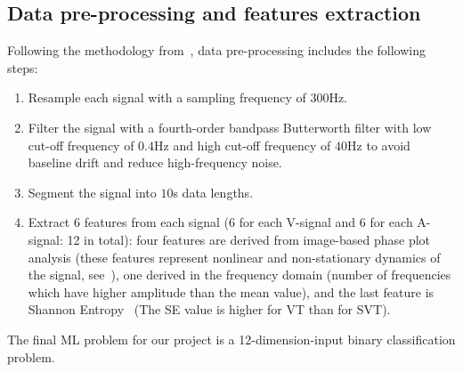 \subsection{Data pre-processing and features extraction}
Following the methodology 
from~\cite{hajeb2018automated}, data pre-processing includes the 
following steps:
\begin{enumerate}
	\item Resample each signal with a sampling frequency of $300$Hz.
	\item Filter the signal with a fourth-order bandpass Butterworth 
	filter with low cut-off frequency of $0.4$Hz and high cut-off 
	frequency of $40$Hz to avoid baseline drift and reduce 
	high-frequency noise. 
	\item Segment the signal into $10$s data lengths.
	\item Extract 6 features from each signal (6 for each V-signal 
	and 6 for each A-signal: 12 in total): 
	four features are derived 
	from image-based phase plot analysis 
	(these features represent nonlinear and non-stationary dynamics
	of the signal, see~\cite{hajeb2018automated}), one derived in the 
	frequency domain (number of frequencies which have higher 
	amplitude than the mean value), and the last feature is Shannon 
	Entropy~\cite{shannon1948mathematical} (The SE value is higher 
	for VT than for SVT).
\end{enumerate}

The final ML problem for our project is a 12-dimension-input binary 
classification problem.

